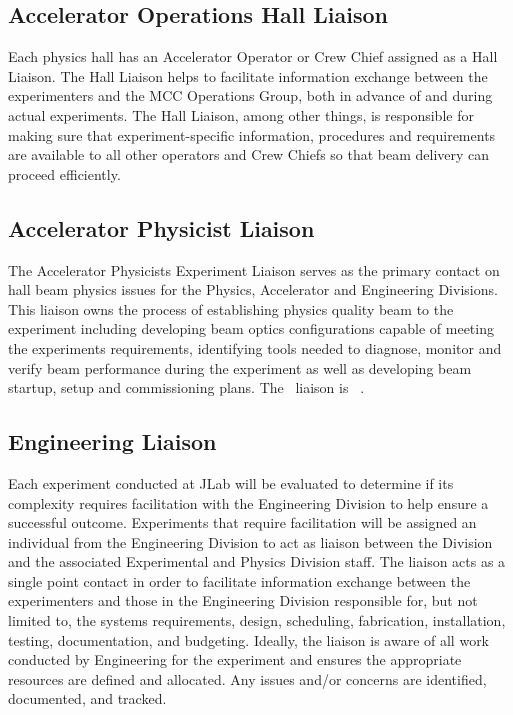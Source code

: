 \documentclass[10pt]{article}
\begin{document}
\subsection{Accelerator Operations Hall Liaison}

Each physics hall has an Accelerator Operator or Crew Chief assigned as a Hall Liaison. 
The Hall Liaison helps to facilitate information exchange between the
experimenters and the MCC Operations Group, both in advance of and during
actual experiments. The Hall Liaison, among other things, is responsible 
for making sure that experiment-specific information, procedures and requirements 
are available to all other operators and Crew Chiefs so that beam delivery can proceed efficiently. 

\subsection{Accelerator Physicist Liaison}

The Accelerator Physicists Experiment Liaison serves as the primary contact on hall beam physics issues 
for the Physics, Accelerator and Engineering Divisions. This liaison owns the process of establishing 
physics quality beam to the experiment including developing beam optics configurations capable of 
meeting the experiments requirements, identifying tools needed to diagnose, monitor and verify 
beam performance during the experiment as well as developing beam startup, setup and commissioning 
plans. The \HALL\ liaison is \AccPhysLiaison\ .


\subsection{Engineering Liaison}

Each experiment conducted at JLab will be evaluated to determine if its complexity requires facilitation 
with the Engineering Division to help ensure a successful outcome.  Experiments that require 
facilitation will be assigned an individual from the Engineering Division to act as liaison 
between the Division and the associated Experimental and Physics Division staff. The liaison 
acts as a single point contact in order to facilitate information exchange 
between the experimenters and those in the Engineering Division responsible for, 
but not limited to, the systems requirements, design, scheduling, fabrication, 
installation, testing, documentation, and budgeting. Ideally, the liaison 
is aware of all work conducted by Engineering for the experiment and ensures 
the appropriate resources are defined and allocated. Any issues and/or concerns are identified, 
documented, and tracked.
\end{document}
